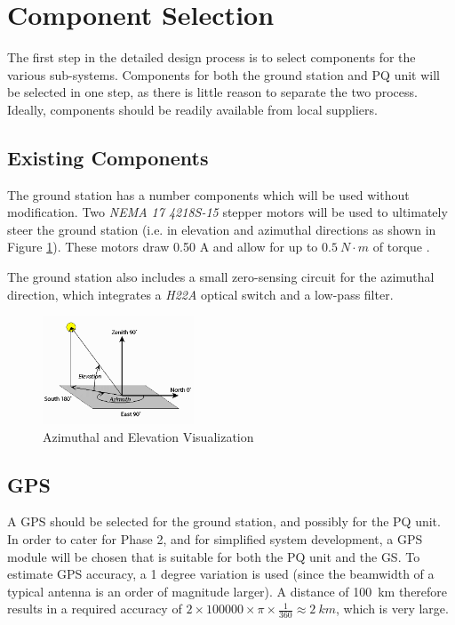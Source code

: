 \graphicspath{{./figures}}

\section{Component Selection}
The first step in the detailed design process is to select components for the various sub-systems. Components for both the ground station and PQ unit will be selected in one step, as there is little reason to separate the two process. Ideally, components should be readily available from local suppliers.

\subsection{Existing Components}
The ground station has a number components which will be used without modification. Two \textit{NEMA 17 4218S-15} stepper motors will be used to ultimately steer the ground station (i.e. in elevation and azimuthal directions as shown in Figure \ref{fig:az_elevation}). These motors draw 0.50 A and allow for up to $\SI{0.5}{N \cdot m}$ of torque \cite{datasheet-4118}.

The ground station also includes a small zero-sensing circuit for the azimuthal direction, which integrates a \textit{H22A} optical switch \cite{datasheet-H22A1} and a low-pass filter.

\begin{figure}[!htb]
    \centering
    \includegraphics[width=0.4\textwidth]{az_elevation}
    \caption{Azimuthal and Elevation Visualization \cite{site-azElevationVisual}}
    \label{fig:az_elevation}
  \end{figure}

\subsection{GPS}\label{sec:components_gps}
A GPS should be selected for the ground station, and possibly for the PQ unit. In order to cater for Phase 2, and for simplified system development, a GPS module will be chosen that is suitable for both the PQ unit and the GS. To estimate GPS accuracy, a 1 degree variation is used (since the beamwidth of a typical antenna is an order of magnitude larger). A distance of \SI{100}{km} therefore results in a required accuracy of $2 \times 100 000 \times \pi \times \frac{1}{360} \approx \SI{2}{km}$, which is very large.

